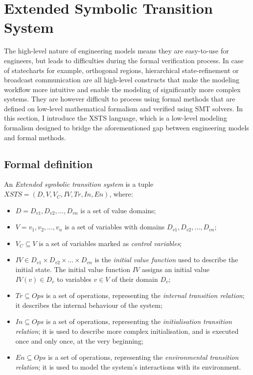 \section{Extended Symbolic Transition System}\label{sec:xsts}

The high-level nature of engineering models means they are easy-to-use for engineers,
but leads to difficulties during the formal verification process. In case of statecharts for
example, orthogonal regions, hierarchical state-refinement or broadcast communication
are all high-level constructs that make the modeling workflow more intuitive and enable
the modeling of significantly more complex systems. They are however difficult to process
using formal methods that are defined on low-level mathematical formalism and verified
using SMT solvers. In this section, I introduce the XSTS language, which is a low-level modeling formalism designed to bridge the aforementioned gap between engineering models and formal methods.

\subsection{Formal definition}

\begin{definition}
	
	An \emph{Extended symbolic transition system} is a tuple \( XSTS = (D, V, V_C, IV, Tr, In, En) \), where:
	
	\begin{itemize}
		\item \(D = {D_{v1}, D_{v2}, \dots, D_{vn}}\) is a set of value domains;
		\item \(V = {v_1, v_2, \dots, v_n}\) is a set of variables with domains \(D_{v1}, D_{v2}, \dots, D_{vn}\);
		\item \(V_C \subseteq V\) is a set of variables marked as \emph{control variables};
		\item \(IV \in D_{v1} \times D_{v2} \times \dots \times D_{vn}\) is the \emph{initial value function} used to describe the initial state. The initial value function \(IV\) assigns an initial value \(IV(v) \in D_v\) to variables \(v \in V\) of their domain \(D_v\);
		\item \(Tr \subseteq Ops\) is a set of operations, representing the \emph{internal transition relation}; it describes the internal behaviour of the system;
		\item \(In \subseteq Ops\) is a set of operations, representing the \emph{initialisation transition relation}; it is used to describe more complex initialisation, and is executed once and only once, at the very beginning;
		\item \(En \subseteq Ops\) is a set of operations, representing the \emph{environmental transition relation}; it is used to model the system's interactions with its environment.
	\end{itemize}
\end{definition}\label{def:xsts}

